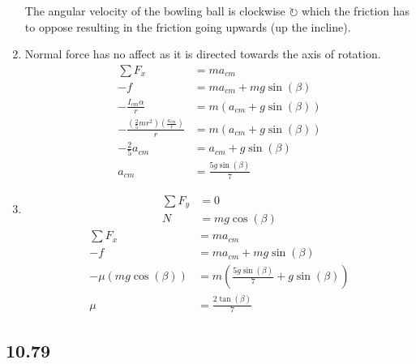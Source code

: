 \documentclass{article}
\begin{document}
\begin{enumerate}[label = \boldalpha]
\begin{center}
		\end{center}
		The angular velocity of the bowling ball is clockwise $ \circlearrowright $ which the friction has to oppose resulting in the friction going upwards (up the incline).
	\item
		Normal force has no affect as it is directed towards the axis of rotation.
		\begin{align*}
			\sum F_x & = ma_{cm} \\
			-f & = ma_{cm} + mg\sin(\beta) \\
			-\frac{ I_{cm}\alpha }{ r } & = m(a_{cm} + g\sin(\beta)) \\
			-\frac{ \left( \frac{2}{5}mr^2 \right) \left( \frac{ a_{cm} }{ r } \right) }{ r } & = m(a_{cm} + g\sin(\beta)) \\
			-\frac{2}{5}a_{cm} & = a_{cm} + g\sin(\beta) \\
			a_{cm} & = \frac{5g\sin(\beta)}{7}
		\end{align*}
	\item
		\begin{align*}
			\sum F_y & = 0 \\
			N & = mg\cos(\beta)
		\end{align*}
		\begin{align*}
			\sum F_x & = ma_{cm} \\
			-f & = ma_{cm} + mg\sin(\beta) \\
			-\mu(mg\cos(\beta)) & = m \left( \frac{5g\sin(\beta)}{7} + g\sin(\beta) \right) \\
			\mu & = \frac{2\tan(\beta)}{7}
		\end{align*}
\end{enumerate}

\subsection{10.79}
\end{document}
